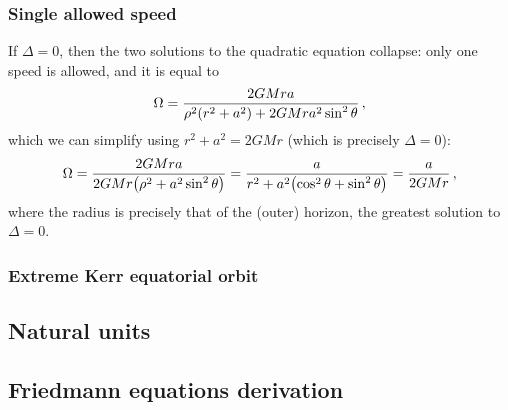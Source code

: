 \documentclass[main.tex]{subfiles}
\begin{document}
\subsubsection{Single allowed speed}

If \(\Delta = 0\), then the two solutions to the quadratic equation collapse: only one speed is allowed, and it is equal to 
%
\begin{align}
\Omega = \frac{2GMra}{\rho^2 \qty(r^2+a^2) + 2GMr a^2 \sin^2\theta }
\,,
\end{align}
%
which we can simplify using \(r^2+a^2 = 2GMr\) (which is  precisely \(\Delta = 0\)): 
%
\begin{align}
\Omega = \frac{2GMra}{2GMr \qty( \rho^2 + a^2 \sin^2 \theta )} = \frac{a}{r^2 + a^2 \qty(\cos^2\theta +\sin^2\theta )} = \frac{a}{2GMr}
\,,
\end{align}
%
where the radius is precisely that of the (outer) horizon, the greatest solution  to \(\Delta = 0\). 


\subsubsection{Extreme Kerr equatorial orbit}



\subsection{Natural units}

\subsection{Friedmann equations derivation}
\end{document}

